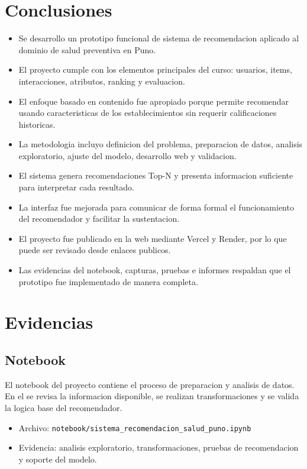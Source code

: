 \documentclass[12pt,a4paper]{article}
\begin{document}
\section{Conclusiones}
\begin{itemize}[leftmargin=*]
  \item Se desarrollo un prototipo funcional de sistema de recomendacion aplicado al dominio de salud preventiva en Puno.
  \item El proyecto cumple con los elementos principales del curso: usuarios, items, interacciones, atributos, ranking y evaluacion.
  \item El enfoque basado en contenido fue apropiado porque permite recomendar usando caracteristicas de los establecimientos sin requerir calificaciones historicas.
  \item La metodologia incluyo definicion del problema, preparacion de datos, analisis exploratorio, ajuste del modelo, desarrollo web y validacion.
  \item El sistema genera recomendaciones Top-N y presenta informacion suficiente para interpretar cada resultado.
  \item La interfaz fue mejorada para comunicar de forma formal el funcionamiento del recomendador y facilitar la sustentacion.
  \item El proyecto fue publicado en la web mediante Vercel y Render, por lo que puede ser revisado desde enlaces publicos.
  \item Las evidencias del notebook, capturas, pruebas e informes respaldan que el prototipo fue implementado de manera completa.
\end{itemize}

\section{Evidencias}
\subsection{Notebook}
El notebook del proyecto contiene el proceso de preparacion y analisis de datos. En el se revisa la informacion disponible, se realizan transformaciones y se valida la logica base del recomendador.

\begin{itemize}[leftmargin=*]
  \item Archivo: \texttt{notebook/sistema\_recomendacion\_salud\_puno.ipynb}
  \item Evidencia: analisis exploratorio, transformaciones, pruebas de recomendacion y soporte del modelo.
\end{itemize}
\end{document}
